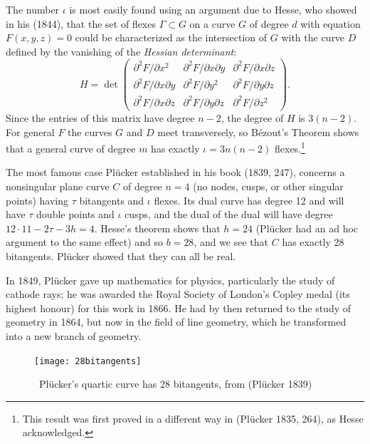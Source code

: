 \documentclass[11pt]{article}
\begin{document}
The number $\iota$ is most easily found using an argument due to Hesse, who showed  in his (1844),  that the set of flexes $\Gamma\subset G$ on a curve $G$ of degree $d$ with equation $F(x, y, z) = 0$ could be characterized as the intersection of $G$  with the curve $D$ defined by the vanishing of the \emph{Hessian determinant}:
$$
H = \det \begin{pmatrix}
 \partial^{2}F/\partial x^{2} &\partial^{2}F/\partial x\partial y &\partial^{2}F/\partial x\partial z \\
\partial^{2}F/\partial x\partial y  &\partial^{2}F/\partial y^{2} &\partial^{2}F/\partial y\partial z \\
\partial^{2}F/\partial x\partial z &\partial^{2}F/\partial y\partial z &\partial^{2}F/\partial z^{2} 
\end{pmatrix}.
$$
Since the entries of this matrix have degree $n-2$, the degree of $H$ is $3(n-2).$ For general $F$ the curves $G$ and $D$ meet transversely, so B\'ezout's Theorem shows that a general curve of degree $m$ has exactly $\iota = 3n(n-2)$ flexes.\footnote{This result was first proved in a different way in (Pl\"ucker 1835, 264), as Hesse acknowledged.}

The most famous case Pl\"ucker established in  his book (1839, 247),  concerns   a nonsingular plane curve $C$ of degree $n=4$  (no nodes, cusps, or other singular points) having $\tau$ bitangents and $\iota$ flexes.   Its dual curve has degree 12 and will have $\tau$ double points and $\iota$ cusps, and the dual of the dual will have degree 
$12\cdot 11 - 2\tau - 3h  = 4.$ 
Hesse's theorem shows that $h = 24$ (Pl\"ucker had an ad hoc argument to the same effect)  and so $b = 28$,  and we  see that $C$ has exactly 28 bitangents. Pl\"ucker showed that they can all be real.

In 1849, Pl\"ucker gave up mathematics for physics, particularly the study of cathode rays; he was awarded the Royal Society of London's Copley medal (its highest honour) for this work in 1866. He had by then returned to the study of geometry in 1864, but now in the field of line geometry, which he transformed into a new branch of geometry. 

\bigskip

\begin{center}
    \begin{figure}
   \begin{center}  \texttt{[image: 28bitangents]} 
   \end{center}
     \protect \caption{\, Pl\"ucker's quartic curve has 28 bitangents, from (Pl\"ucker 1839)}
      \label{fig28bitangents}
     \end{figure}
\end{center}
\bigskip
\end{document}
